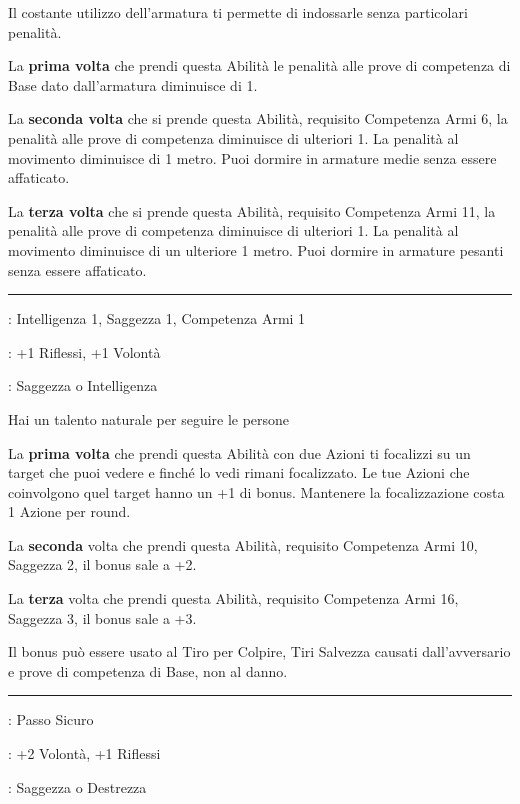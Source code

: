 \begin{multicols}{2}
Il costante utilizzo dell'armatura ti permette di indossarle senza particolari penalità.

La \textbf{prima volta} che prendi questa Abilità le penalità alle prove di competenza di Base dato dall'armatura diminuisce di 1.

La \textbf{seconda volta} che si prende questa Abilità, requisito Competenza Armi 6, la penalità alle prove di competenza diminuisce di ulteriori 1. La penalità al movimento diminuisce di 1 metro. Puoi dormire in armature medie senza essere affaticato.

La \textbf{terza volta} che si prende questa Abilità, requisito Competenza Armi 11, la penalità alle prove di competenza diminuisce di ulteriori 1. La penalità al movimento diminuisce di un ulteriore 1 metro. Puoi dormire in armature pesanti senza essere affaticato.

\smallskip\noindent\rule{\linewidth}{2pt} \hypertarget{Segugio}{}\medskip{}
\noindent
\begin{description}[noitemsep, topsep=0pt, parsep=0pt, partopsep=0pt, leftmargin=0cm, labelwidth=2.5cm]
    \item[\textbf{Requisito}]: Intelligenza 1, Saggezza 1, Competenza Armi 1
    \item[\textbf{Tiri Salvezza}]: +1 Riflessi, +1 Volontà
    \item[\textbf{Caratteristica}]: Saggezza o Intelligenza
\end{description}

Hai un talento naturale per seguire le persone

La \textbf{prima volta} che prendi questa Abilità con due Azioni ti focalizzi su un target che puoi vedere e finché lo vedi rimani focalizzato. Le tue Azioni che coinvolgono quel target hanno un +1 di bonus. Mantenere la focalizzazione costa 1 Azione per round.

La \textbf{seconda} volta che prendi questa Abilità, requisito Competenza Armi 10, Saggezza 2, il bonus sale a +2.

La \textbf{terza} volta che prendi questa Abilità, requisito Competenza Armi 16, Saggezza 3, il bonus sale a +3.

Il bonus può essere usato al Tiro per Colpire, Tiri Salvezza causati dall'avversario e prove di competenza di Base, non al danno.

\smallskip\noindent\rule{\linewidth}{2pt} \hypertarget{Senza Traccia}{}\medskip{}
\noindent
\begin{description}[noitemsep, topsep=0pt, parsep=0pt, partopsep=0pt, leftmargin=0cm, labelwidth=2.5cm]
    \item[\textbf{Requisito}]: Passo Sicuro
    \item[\textbf{Tiri Salvezza}]: +2 Volontà, +1 Riflessi
    \item[\textbf{Caratteristica}]: Saggezza o Destrezza
\end{description}


\end{multicols}
